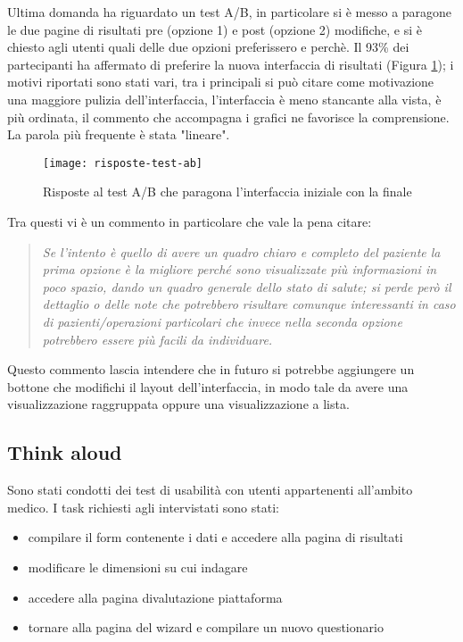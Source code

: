 Ultima domanda ha riguardato un test A/B, in particolare si è messo a paragone le due pagine di risultati pre (opzione 1) e post (opzione 2) modifiche, e si è chiesto agli utenti quali delle due opzioni preferissero e perchè. Il 93\% dei partecipanti ha affermato di preferire la nuova interfaccia di risultati (Figura \ref{fig:risposte-test-ab}); i motivi riportati sono stati vari, tra i principali si può citare come motivazione una maggiore pulizia dell'interfaccia, l'interfaccia è meno stancante alla vista, è più ordinata, il commento che accompagna i grafici ne favorisce la comprensione. La parola più frequente è stata "lineare". \\

\begin{figure}[!ht] 
    \centering 
    \texttt{[image: risposte-test-ab]}
    \caption{Risposte al test A/B che paragona l'interfaccia iniziale con la finale}
    \label{fig:risposte-test-ab}
\end{figure}

Tra questi vi è un commento in particolare che vale la pena citare: 
\begin{quote}
    \textit{Se l'intento è quello di avere un quadro chiaro e completo del paziente la prima opzione è la migliore perché sono visualizzate più informazioni in poco spazio, dando un quadro generale dello stato di salute; si perde però il dettaglio o delle note che potrebbero risultare comunque interessanti in caso di pazienti/operazioni particolari che invece nella seconda opzione potrebbero essere più facili da individuare.}
\end{quote}
Questo commento lascia intendere che in futuro si potrebbe aggiungere un bottone che modifichi il layout dell'interfaccia, in modo tale da avere una visualizzazione raggruppata oppure una visualizzazione a lista.

\subsection{Think aloud}
Sono stati condotti dei test di usabilità con utenti appartenenti all'ambito medico.
I task richiesti agli intervistati sono stati:
\begin{itemize}
    \item compilare il form contenente i dati e accedere alla pagina di risultati
    \item modificare le dimensioni su cui indagare
    \item accedere alla pagina divalutazione piattaforma
    \item tornare alla pagina del wizard e compilare un nuovo questionario 
\end{itemize}

